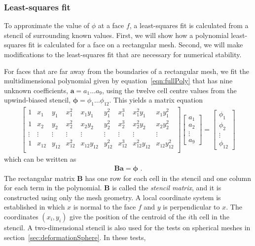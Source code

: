 \subsubsection{Least-squares fit}
To approximate the value of $\phi$ at a face $f$, a least-squares fit is calculated from a stencil of surrounding known values.  First, we will show how a polynomial least-squares fit is calculated for a face on a rectangular mesh.  Second, we will make modifications to the least-squares fit that are necessary for numerical stability.  

For faces that are far away from the boundaries of a rectangular mesh, we fit the multidimensional polynomial given by equation~\eqref{eqn:fullPoly} that has nine unknown coefficients, $\mathbf{a} = a_1 \ldots a_9$, using the twelve cell centre values from the upwind-biased stencil, $\bm{\phi} = \phi_1 \ldots \phi_{12}$.  This yields a matrix equation
\begin{align}
	\begin{bmatrix}
		1 & x_1 & y_1 & x_1^2 & x_1 y_1 & y_1^2 & x_1^3 & x_1^2 y_1 & x_1 y_1^2 \\
		1 & x_2 & y_2 & x_2^2 & x_2 y_2 & y_2^2 & x_2^3 & x_2^2 y_2 & x_2 y_2^2 \\
		\vdots & \vdots & \vdots & \vdots & \vdots & \vdots & \vdots & \vdots & \vdots \\
		1 & x_{12} & y_{12} & x_{12}^2 & x_{12} y_{12} & y_{12}^2 & x_{12}^3 & x_{12}^2 y_{12} & x_{12} y_{12}^2 \\
	\end{bmatrix}
	\begin{bmatrix}
		a_1 \\
		a_2 \\
		\vdots \\
		a_9
	\end{bmatrix}
	=
	\begin{bmatrix}
		\phi_1 \\
		\phi_2 \\
		\vdots \\
		\phi_{12}
	\end{bmatrix}
\end{align}
which can be written as
\begin{align}
	\mathbf{B} \mathbf{a} = \bm{\phi} \label{eqn:unweightedLeastSquares} \text{ .}
\end{align}
The rectangular matrix $\mathbf{B}$ has one row for each cell in the stencil and one column for each term in the polynomial.  $\mathbf{B}$ is called the \textit{stencil matrix}, and it is constructed using only the mesh geometry.
A local coordinate system is established in which $x$ is normal to the face $f$ and $y$ is perpendicular to $x$.
The coordinates $(x_i, y_i)$ give the position of the centroid of the $i$th cell in the stencil.
A two-dimensional stencil is also used for the tests on spherical meshes in section~\ref{sec:deformationSphere}.  In these tests, 

